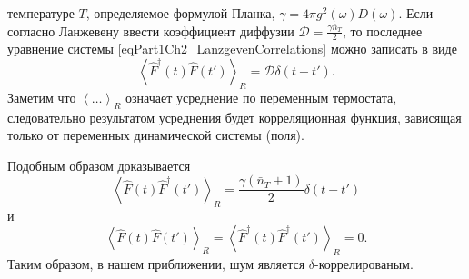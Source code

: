 температуре $T$, определяемое формулой Планка,
$\gamma = 4 \pi g^2\left(\omega\right)D\left(\omega\right)$.
Если согласно Ланжевену ввести коэффициент диффузии $\mathcal{D} =
\frac{\gamma \bar{n}_{T}}{2}$, то последнее уравнение системы
\eqref{eqPart1Ch2_LanzgevenCorrelations} можно записать в виде
\begin{equation}
\left<\hat{F}^{\dag}\left(t\right)\hat{F}\left(t'\right)\right>_R = 
\mathcal{D} \delta\left(t - t'\right). 
\nonumber
\end{equation}
Заметим что $\left<\dots\right>_R$ означает усреднение по переменным
термостата, следовательно результатом усреднения будет корреляционная
функция, зависящая только от переменных динамической системы (поля).

Подобным образом доказывается
\begin{equation}
\left<\hat{F}\left(t\right)\hat{F}^{\dag}\left(t'\right)\right>_R = 
\frac{\gamma\left(\bar{n}_{T} + 1\right)}{2} \delta\left(t - t'\right)
\label{eqPart1Ch2_Lanzgeven_Task1}
\end{equation}
и
\begin{equation}
\left<\hat{F}\left(t\right)\hat{F}\left(t'\right)\right>_R = 
\left<\hat{F}^{\dag}\left(t\right)\hat{F}^{\dag}\left(t'\right)\right>_R = 0.
\label{eqPart1Ch2_Lanzgeven_Task2}
\end{equation}
Таким образом, в нашем приближении, шум является
$\delta$-коррелированым.

